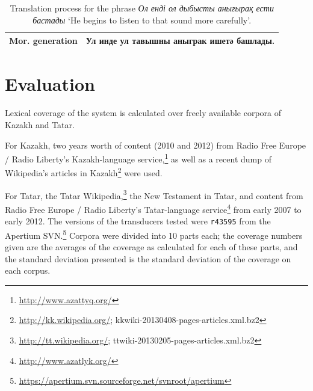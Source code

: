\documentclass[11pt]{article}
\newcommand{\tag}[1]{{\small{\texttt{#1}}}}
\newcommand{\eng}[1]{`#1'}
\begin{document}
\begin{table}[htbp]
\begin{tabular}{ll}
\midrule
{\bf Mor. generation} & Ул инде ул тавышны аныграк ишетә башлады. \\
\bottomrule
\end{tabular}
 \caption{Translation process for the phrase \emph{Ол енді ол дыбысты анығырақ ести бастады} \eng{He begins to listen to that sound more carefully}.}
\end{table}

\section{Evaluation}
\label{sec:eval}

Lexical coverage of the system is calculated over freely available corpora of Kazakh and Tatar.

For Kazakh, two years worth of content (2010 and 2012) from Radio Free Europe / Radio Liberty's Kazakh-language service,\footnote{\url{http://www.azattyq.org/}} as well as a recent dump of Wikipedia's articles in Kazakh\footnote{\url{http://kk.wikipedia.org/}; {\smallertt kkwiki-20130408-pages-articles.xml.bz2}} were used.

For Tatar, the Tatar Wikipedia,\footnote{\url{http://tt.wikipedia.org/}; {\smallertt ttwiki-20130205-pages-articles.xml.bz2}} the New Testament in Tatar, and content from Radio Free Europe / Radio Liberty's Tatar-language service\footnote{\url{http://www.azatlyk.org/}} from early 2007 to early 2012.
The versions of the transducers tested were {\tt {\small r43595}} from the Apertium SVN.\footnote{\url{https://apertium.svn.sourceforge.net/svnroot/apertium}}  Corpora were divided into 10 parts each; the coverage numbers given are the averages of the coverage as calculated for each of these parts, and the standard deviation presented is the standard deviation of the coverage on each corpus.
\end{document}
